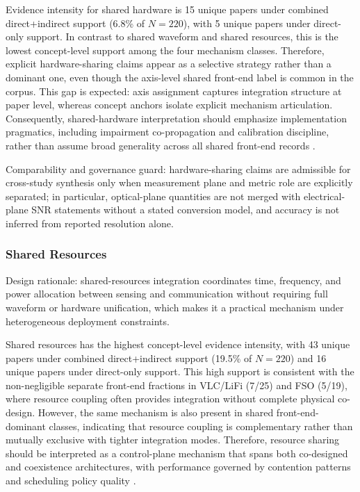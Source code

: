 \documentclass[lettersize,journal]{IEEEtran}
\begin{document}
Evidence intensity for shared hardware is 15 unique papers under combined direct+indirect support (6.8\% of $N=220$), with 5 unique papers under direct-only support. In contrast to shared waveform and shared resources, this is the lowest concept-level support among the four mechanism classes. Therefore, explicit hardware-sharing claims appear as a selective strategy rather than a dominant one, even though the axis-level shared front-end label is common in the corpus. This gap is expected: axis assignment captures integration structure at paper level, whereas concept anchors isolate explicit mechanism articulation. Consequently, shared-hardware interpretation should emphasize implementation pragmatics, including impairment co-propagation and calibration discipline, rather than assume broad generality across all shared front-end records \cite{O_ISAC_021,O_ISAC_164,O_ISAC_324,O_ISAC_056,O_ISAC_161}.

Comparability and governance guard: hardware-sharing claims are admissible for cross-study synthesis only when measurement plane and metric role are explicitly separated; in particular, optical-plane quantities are not merged with electrical-plane SNR statements without a stated conversion model, and accuracy is not inferred from reported resolution alone.

\subsubsection{Shared Resources}
Design rationale: shared-resources integration coordinates time, frequency, and power allocation between sensing and communication without requiring full waveform or hardware unification, which makes it a practical mechanism under heterogeneous deployment constraints.

Shared resources has the highest concept-level evidence intensity, with 43 unique papers under combined direct+indirect support (19.5\% of $N=220$) and 16 unique papers under direct-only support. This high support is consistent with the non-negligible separate front-end fractions in VLC/LiFi (7/25) and FSO (5/19), where resource coupling often provides integration without complete physical co-design. However, the same mechanism is also present in shared front-end-dominant classes, indicating that resource coupling is complementary rather than mutually exclusive with tighter integration modes. Therefore, resource sharing should be interpreted as a control-plane mechanism that spans both co-designed and coexistence architectures, with performance governed by contention patterns and scheduling policy quality \cite{O_ISAC_061,O_ISAC_114,O_ISAC_142,O_ISAC_141,O_ISAC_021}.
\end{document}
